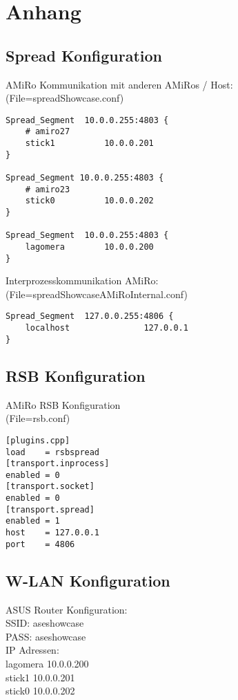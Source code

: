 \chapter{Anhang}

\section{Spread Konfiguration}
\label{sec:spread-config}

AMiRo Kommunikation mit anderen AMiRos / Host:\\
(File=spreadShowcase.conf)

\lstset{language=bash}
\begin{lstlisting}
Spread_Segment  10.0.0.255:4803 {
	# amiro27
	stick1          10.0.0.201
}

Spread_Segment 10.0.0.255:4803 {
	# amiro23    
	stick0          10.0.0.202
}

Spread_Segment  10.0.0.255:4803 {
	lagomera        10.0.0.200
}
\end{lstlisting}

Interprozesskommunikation AMiRo:\\
(File=spreadShowcaseAMiRoInternal.conf)

\begin{lstlisting}
Spread_Segment  127.0.0.255:4806 {
	localhost               127.0.0.1
}
\end{lstlisting}


\section{RSB Konfiguration}
\label{sec:rsb-config}
AMiRo RSB Konfiguration\\
(File=rsb.conf)

\begin{lstlisting}
[plugins.cpp]
load    = rsbspread
[transport.inprocess]
enabled = 0
[transport.socket]
enabled = 0
[transport.spread]
enabled = 1
host    = 127.0.0.1
port    = 4806
\end{lstlisting}


\section{W-LAN Konfiguration}
\label{sec:wlan-config}
ASUS Router Konfiguration:\\
SSID: aseshowcase\\
PASS: aseshowcase\\

IP Adressen:\\
lagomera 10.0.0.200\\
stick1 10.0.0.201\\
stick0 10.0.0.202\\

